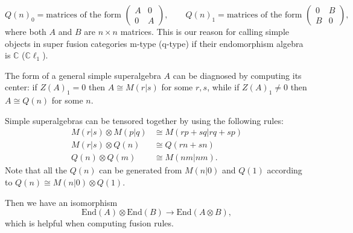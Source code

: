 \documentclass[12pt,a4paper]{article}
\newcounter{arrow}
\newcommand{\tp}{\otimes}
\newcommand{\ra}{\rightarrow}
\newcommand{\cc}{\mathbb{C}}
\newcommand\be            {\begin{equation}}
\newcommand\ee            {\end{equation}}
\newcommand{\End}{\text{End}}
\newcommand{\cl}{\mathbb{C}\ell}
\begin{document}
\be Q(n)_0 = \text{matrices of the form\ } \begin{pmatrix} A & 0 \\ 0 & A \end{pmatrix},\qquad Q(n)_1 = \text{matrices of the form\ } \begin{pmatrix} 0 & B \\ B & 0 \end{pmatrix},\ee
where both $A$ and $B$ are $n\times n$ matrices. 
This is our reason for calling simple objects in super fusion categories m-type (q-type) if their endomorphism algebra is $\cc$ ($\cl_1$). 

The form of a general simple superalgebra $A$ can be diagnosed by computing its center: if $Z(A)_1 = 0$ then $A \cong M(r|s)$ for some $r,s$, while if $Z(A)_1 \neq 0$ then $A\cong Q(n)$ for some $n$. 

Simple superalgebras can be tensored together by using the following rules:
\be \begin{aligned} M(r|s) \tp M(p|q) & \cong M(rp+sq|rq+sp) \\ 
M(r|s) \tp Q(n) & \cong Q(rn+sn) \\ 
Q(n) \tp Q(m) & \cong M(nm | nm). \end{aligned}
\ee
Note that all the $Q(n)$ can be generated from $M(n|0)$ and $Q(1)$ according to $Q(n) \cong M(n|0)\tp Q(1)$. 

Then we have an isomorphism 
\be \End(A) \tp \End(B) \ra \End(A\tp B),\ee
which is helpful when computing fusion rules. 
\end{document}
